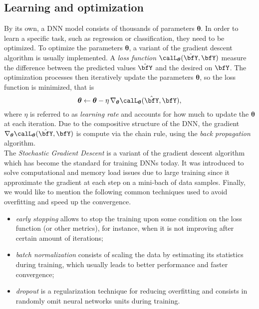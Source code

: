 \subsection{Learning and optimization}
\newcommand{\params}{\ensuremath{\boldsymbol{\theta}}}
By its own, a \ac{DNN} model consists of thousands of parameters $\params$.
In order to learn a specific task, such as regression or classification, they need to be optimized.
To optimize the parameters $\params$, a variant of the gradient descent algorithm is usually implemented.
A \textit{loss function} $\calL_{\params}(\hat{\bfY},\bfY)$ measure the difference between the predicted values $\hat{\bfY}$ and the desired on $\bfY$.
The optimization processes then iteratively update the parameters $\params$, so the loss function is minimized, that is
\begin{equation*}
    \params \gets \params - \eta \knabla_{\params} \calL_{\params}(\hat{\bfY},\bfY)
    ,
\end{equation*}
where $\eta$ is referred to as \textit{learning rate} and accounts for how much to update the $\params$ at each iteration.
Due to the compositive structure of the \ac{DNN}, the gradient $\knabla_{\params} \calL_{\params}(\hat{\bfY},\bfY)$ is compute via the chain rule, using the \textit{back propagation} algorithm.
\\The \textit{Stochastic Gradient Descent} is a variant of the gradient descent algorithm which has become the standard for training \acp{DNN} today.
It was introduced to solve computational and memory load issues due to large training since it approximate the gradient at each step on a mini-bach of data samples.
Finally, we would like to mention the following common techniques used to avoid overfitting and speed up the convergence.
\begin{itemize}
    \item \textit{early stopping} allows to stop the training upon some condition on the loss function (or other metrics), for instance, when it is not improving after certain amount of iterations;
    \item \textit{batch normalization} consists of scaling the data by estimating its statistics during training, which usually leads to better performance and faster convergence;
    \item \textit{dropout} is a regularization technique for reducing overfitting and consists in randomly omit neural networks units during training.
\end{itemize}

